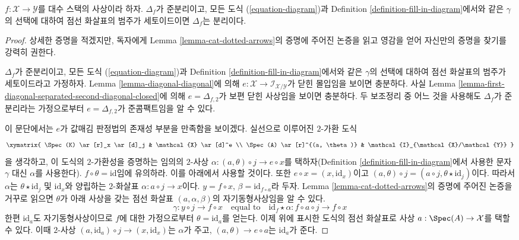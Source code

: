 \begin{lemma}
\label{lemma-setoids-and-diagonal}
$f : \mathcal{X} \to \mathcal{Y}$를 대수 스택의 사상이라 하자.
$\Delta_f$가 준분리이고, 모든 도식 (\ref{equation-diagram})과 Definition
\ref{definition-fill-in-diagram}에서와 같은 $\gamma$의 선택에 대하여 점선
화살표의 범주가 세토이드이면 $\Delta_f$는 분리이다.
\end{lemma}

\begin{proof}
상세한 증명을 적겠지만, 독자에게 Lemma
\ref{lemma-cat-dotted-arrows}의 증명에 주어진 논증을 읽고 영감을 얻어
자신만의 증명을 찾기를 강력히 권한다.

\medskip\noindent
$\Delta_f$가 준분리이고, 모든 도식 (\ref{equation-diagram})과 Definition
\ref{definition-fill-in-diagram}에서와 같은 $\gamma$의 선택에 대하여 점선
화살표의 범주가 세토이드라고 가정하자. Lemma
\ref{lemma-diagonal-diagonal}에 의해
$e : \mathcal{X} \to \mathcal{I}_{\mathcal{X}/\mathcal{Y}}$가 닫힌
몰입임을 보이면 충분하다. 사실 Lemma
\ref{lemma-first-diagonal-separated-second-diagonal-closed}에 의해
$e = \Delta_{f, 2}$가 보편 닫힌 사상임을 보이면 충분하다. 두 보조정리
중 어느 것을 사용해도 $\Delta_f$가 준분리라는 가정으로부터
$e = \Delta_{f, 2}$가 준콤팩트임을 알 수 있다.

\medskip\noindent
이 문단에서는 $e$가 값매김 판정법의 존재성 부분을 만족함을 보이겠다.
실선으로 이루어진 $2$-가환 도식
$$
\xymatrix{
\Spec(K) \ar[r]_x \ar[d]_j & \mathcal{X} \ar[d]^e \\
\Spec(A) \ar[r]^{(a, \theta)} & \mathcal{I}_{\mathcal{X}/\mathcal{Y}}
}
$$
을 생각하고, 이 도식의 $2$-가환성을 증명하는 임의의 $2$-사상
$\alpha : (a, \theta) \circ j \to e \circ x$를 택하자(Definition
\ref{definition-fill-in-diagram}에서 사용한 문자 $\gamma$ 대신
$\alpha$를 사용한다). $f \circ \theta = \text{id}$임에 유의하라. 이를
아래에서 사용할 것이다. 또한
$e \circ x = (x, \text{id}_x)$이고
$(a, \theta) \circ j = (a \circ j, \theta \star \text{id}_j)$이다.
따라서 $\alpha$는 $\theta \star \text{id}_j$ 및 $\text{id}_x$와
양립하는 $2$-화살표 $\alpha : a \circ j \to x$이다.
$y = f \circ x$, $\beta = \text{id}_{f \circ a}$라 두자. Lemma
\ref{lemma-cat-dotted-arrows}의 증명에 주어진 논증을 거꾸로 읽으면
$\theta$가 아래 사상을 갖는 점선 화살표
$(a, \alpha, \beta)$의 자기동형사상임을 알 수 있다.
$$
\gamma : y \circ j \to f \circ x
\quad\text{equal to}\quad
\text{id}_f \star \alpha : f \circ a \circ j \to f \circ x
$$
한편 $\text{id}_a$도 자기동형사상이므로 $f$에 대한 가정으로부터
$\theta = \text{id}_a$를 얻는다. 이제 위에 표시한 도식의 점선 화살표로
사상 $a : \Spec(A) \to \mathcal{X}$를 택할 수 있다. 이때 $2$-사상
$(a, \text{id}_a) \circ j \to (x, \text{id}_x)$는 $\alpha$가 주고,
$(a, \theta) \to e \circ a$는 $\text{id}_a$가 준다.


\end{proof}
